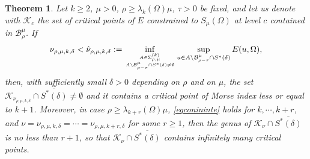 \documentclass[10pt,a4paper]{article}
\newtheorem{theorem}{Theorem}[section]
\theoremstyle{definition} \theoremstyle{remark}
\numberwithin{equation}{section}
\newcommand{\B}{\mathcal{B}}
\newcommand{\K}{\mathcal{K}}
\newcommand{\la}{\lambda}
\begin{document}
\begin{theorem} \label{thmgenus}
	Let $k \geq 2$, $\mu > 0$, $\rho \geq \la_k(\Omega)\mu$, $\tau > 0$ be fixed, and let us denote with $\K_c$ the set of critical points of $E$ constrained to $S_\mu(\Omega)$ at level $c$ contained in $\B_\rho^\mu$. If
	\begin{align} \label{eqconininte}
		\nu_{\rho,\mu,k,\delta} < \hat \nu_{\rho,\mu,k,\delta} := \inf_{A \in \Sigma_{\rho,\mu}^{(k)} \atop A \backslash \B_{\rho -\tau}^\mu \cap S^*(\delta) \neq \emptyset} \sup_{u \in A \backslash \B_{\rho -\tau}^\mu \cap S^*(\delta)}E(u,\Omega),
	\end{align}
    then, with sufficiently small $\delta > 0$ depending on $\rho$ and on $\mu$, the set $\K_{\nu_{\rho,\mu,k,\delta}} \cap \overline{S^*(\delta)} \neq \emptyset$ and it contains a critical point of Morse index less or equal to $k+1$. Moreover, in case $\rho \geq \la_{k+r}(\Omega)\mu$, \eqref{eqconininte} holds for $k, \cdots, k+r$, and $\nu = \nu_{\rho,\mu,k,\delta} = \cdots = \nu_{\rho,\mu,k+r,\delta}$ for some $r \ge 1$, then the genus of $\K_{\nu} \cap \overline{S^*(\delta)}$ is no less than $r+1$, so that $\K_{\nu} \cap \overline{S^*(\delta)}$ contains infinitely many critical points.
\end{theorem}
\end{document}
